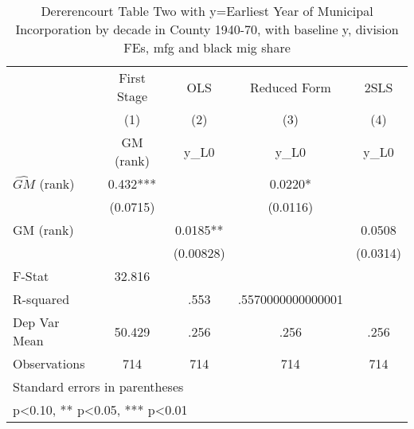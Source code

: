 \begin{table}[htbp]\centering
\def\sym#1{\ifmmode^{#1}\else\(^{#1}\)\fi}
\caption{Dererencourt Table Two with y=Earliest Year of Municipal Incorporation by decade in County 1940-70, with baseline y, division FEs, mfg and black mig share}
\begin{tabular}{l*{4}{c}}
\toprule
                    & First Stage   &         OLS   &Reduced Form   &        2SLS   \\
                    &\multicolumn{1}{c}{(1)}&\multicolumn{1}{c}{(2)}&\multicolumn{1}{c}{(3)}&\multicolumn{1}{c}{(4)}\\
                    &\multicolumn{1}{c}{GM  (rank)}&\multicolumn{1}{c}{y\_L0}&\multicolumn{1}{c}{y\_L0}&\multicolumn{1}{c}{y\_L0}\\
\midrule
$\hat{GM}$ (rank)   &       0.432***&               &      0.0220*  &               \\
                    &    (0.0715)   &               &    (0.0116)   &               \\
\addlinespace
GM  (rank)          &               &      0.0185** &               &      0.0508   \\
                    &               &   (0.00828)   &               &    (0.0314)   \\
\midrule
F-Stat              &      32.816   &               &               &               \\
R-squared           &               &        .553   &.5570000000000001   &               \\
Dep Var Mean        &      50.429   &        .256   &        .256   &        .256   \\
Observations        &         714   &         714   &         714   &         714   \\
\bottomrule
\multicolumn{5}{l}{\footnotesize Standard errors in parentheses}\\
\multicolumn{5}{l}{\footnotesize * p<0.10, ** p<0.05, *** p<0.01}\\
\end{tabular}
\end{table}
